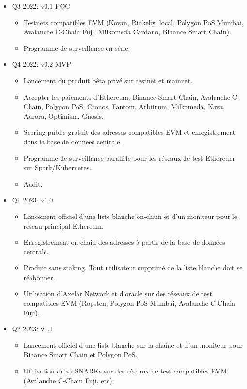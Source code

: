 ﻿\documentclass[a4paper]{article}
\begin{document}
\begin{itemize}
\item
Q3 2022:  v0.1 POC
    \begin{itemize}
    \item Testnets compatibles EVM (Kovan, Rinkeby, local, Polygon PoS Mumbai, Avalanche C-Chain Fuji, Milkomeda Cardano, Binance Smart Chain). 
    \item Programme de surveillance en série. 
    \end{itemize}

\item
Q4 2022: v0.2 MVP
    \begin{itemize}
    \item Lancement du produit bêta privé sur testnet et mainnet.
    \item Accepter les paiements d'Ethereum, Binance Smart Chain, Avalanche C-Chain, Polygon PoS, Cronos, Fantom, Arbitrum, Milkomeda, Kava, Aurora, Optimism, Gnosis. 
    \item Scoring public gratuit des adresses compatibles EVM et enregistrement dans la base de données centrale.
    \item Programme de surveillance parallèle pour les r\'eseaux de test Ethereum sur Spark/Kubernetes.
    \item Audit.
    \end{itemize}

\item
Q1 2023: v1.0
    \begin{itemize}
    \item Lancement officiel d'une liste blanche on-chain et d'un moniteur pour le réseau principal Ethereum.
    \item Enregistrement on-chain des adresses à partir de la base de données centrale.
    \item Produit sans staking. Tout utilisateur supprimé de la liste blanche doit se réabonner.
    \item Utilisation d'Axelar Network et d'oracle sur des réseaux de test compatibles EVM (Ropsten, Polygon PoS Mumbai, Avalanche C-Chain Fuji).
    \end{itemize}

\item
Q2 2023: v1.1
    \begin{itemize}
    \item Lancement officiel d'une liste blanche sur la chaîne et d'un moniteur pour Binance Smart Chain et Polygon PoS.
    \item Utilisation de zk-SNARKs sur des réseaux de test compatibles EVM (Avalanche C-Chain Fuji, etc). 
    \end{itemize}


\end{itemize}
\end{document}
